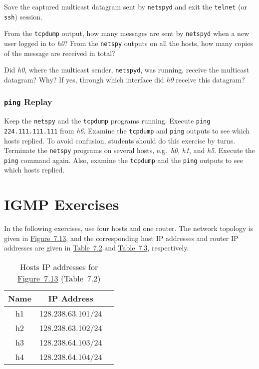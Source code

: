 \documentclass{../UTNetLab}
\begin{document}
    Save the captured multicast datagram sent by \lstinline{netspyd} and exit the \lstinline{telnet} (or \lstinline{ssh}) session.

    \begin{report}
    \item From the \lstinline{tcpdump} output, how many messages are sent by \lstinline{netspyd} when a new user logged in to \textit{h0}?
    From the \lstinline{netspy} outputs on all the hosts, how many copies of the message are received in total?

    \item Did \textit{h0}, where the multicast sender, \lstinline{netspyd}, was running, receive the multicast datagram?
    Why?
    If yes, through which interface did \textit{h0} receive this datagram?
    \end{report}

\section{\texttt{ping} Replay}
    Keep the \lstinline{netspy} and the \lstinline{tcpdump} programs running.
    Execute \lstinline{ping 224.111.111.111} from \textit{h6}.
    Examine the \lstinline{tcpdump} and \lstinline{ping} outputs to see which hosts replied.
    To avoid confusion, students should do this exercise by turns.
    Terminate the \lstinline{netspy} programs on several hosts, e.g.\ \textit{h0}, \textit{h1}, and \textit{h5}.
    Execute the \lstinline{ping} command again.
    Also, examine the \lstinline{tcpdump} and the \lstinline{ping} outputs to see which hosts replied.

\part{IGMP Exercises}\label{sec:igmp}
    In the following exercises, use four hosts and one router.
    The network topology is given in \hyperref[fig:7.13]{Figure~7.13}, and the corresponding host IP addresses and router IP addresses are given in \hyperref[tab:7.2]{Table~7.2} and \hyperref[tab:7.3]{Table~7.3}, respectively.

    \begin{table}[H]
        \caption{Hosts IP addresses for \hyperref[fig:7.13]{Figure~7.13} (Table~7.2)}
        \label{tab:7.2}
        \centering
        \begin{tabular}{ *3c }
            \hline \hline
            Name & IP Address \\
            \hline
                h1 & 128.238.63.101/24 \\
                h2 & 128.238.63.102/24 \\
                h3 & 128.238.64.103/24 \\
                h4 & 128.238.64.104/24 \\
            \hline \hline
            \end{tabular}
    \end{table}
\end{document}
